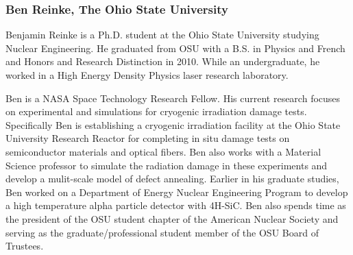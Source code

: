 \subsubsection*{Ben Reinke, The Ohio State University}

Benjamin Reinke is a Ph.D. student at the Ohio State University studying Nuclear
Engineering. He graduated from OSU with a B.S. in Physics and French and Honors
and Research Distinction in 2010. While an undergraduate, he worked in a High
Energy Density Physics laser research laboratory.

Ben is a NASA Space Technology Research Fellow. His current research focuses on
experimental and simulations for cryogenic irradiation damage
tests. Specifically Ben is establishing a cryogenic irradiation facility at the
Ohio State University Research Reactor for completing in situ damage tests on
semiconductor materials and optical fibers. Ben also works with a Material
Science professor to simulate the radiation damage in these experiments and
develop a mulit-scale model of defect annealing. Earlier in his graduate
studies, Ben worked on a Department of Energy Nuclear Engineering Program to
develop a high temperature alpha particle detector with 4H-SiC. Ben also spends
time as the president of the OSU student chapter of the American Nuclear Society
and serving as the graduate/professional student member of the OSU Board of
Trustees.
